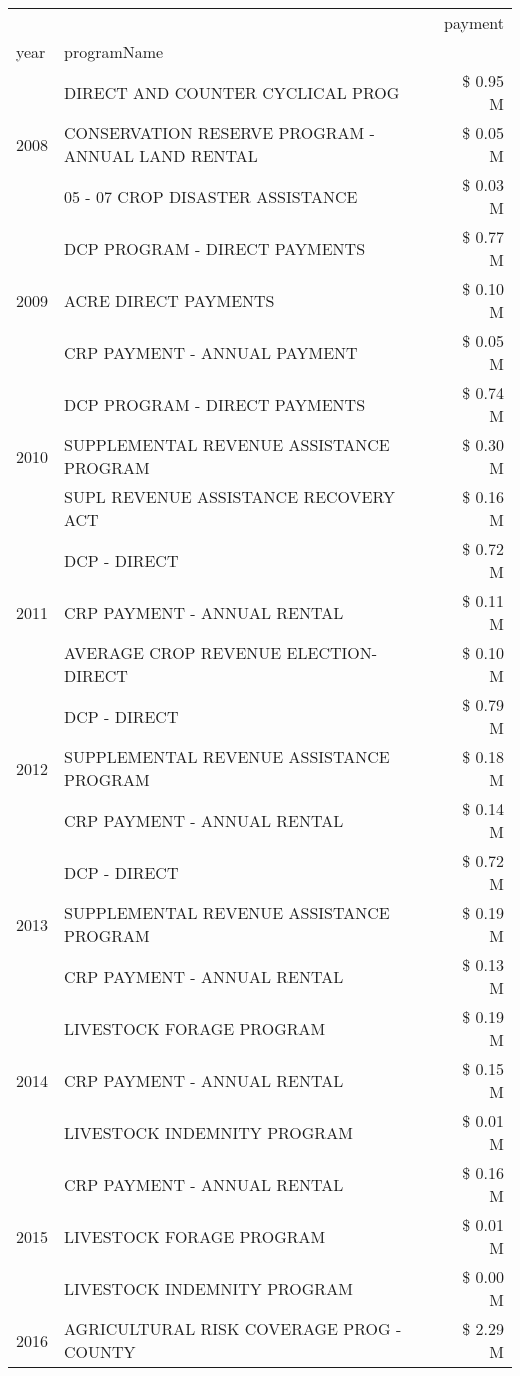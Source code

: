 \begin{tabular}{llr}
\toprule
 &  & payment \\
year & programName &  \\
\midrule
\multirow[t]{3}{*}{2008} & DIRECT AND COUNTER CYCLICAL PROG & \$ 0.95 M \\
 & CONSERVATION RESERVE PROGRAM - ANNUAL LAND RENTAL & \$ 0.05 M \\
 & 05 - 07 CROP DISASTER ASSISTANCE & \$ 0.03 M \\
\cline{1-3}
\multirow[t]{3}{*}{2009} & DCP PROGRAM - DIRECT PAYMENTS & \$ 0.77 M \\
 & ACRE DIRECT PAYMENTS & \$ 0.10 M \\
 & CRP PAYMENT - ANNUAL PAYMENT & \$ 0.05 M \\
\cline{1-3}
\multirow[t]{3}{*}{2010} & DCP PROGRAM - DIRECT PAYMENTS & \$ 0.74 M \\
 & SUPPLEMENTAL REVENUE ASSISTANCE PROGRAM & \$ 0.30 M \\
 & SUPL REVENUE ASSISTANCE RECOVERY ACT & \$ 0.16 M \\
\cline{1-3}
\multirow[t]{3}{*}{2011} & DCP - DIRECT & \$ 0.72 M \\
 & CRP PAYMENT - ANNUAL RENTAL & \$ 0.11 M \\
 & AVERAGE CROP REVENUE ELECTION-DIRECT & \$ 0.10 M \\
\cline{1-3}
\multirow[t]{3}{*}{2012} & DCP - DIRECT & \$ 0.79 M \\
 & SUPPLEMENTAL REVENUE ASSISTANCE PROGRAM & \$ 0.18 M \\
 & CRP PAYMENT - ANNUAL RENTAL & \$ 0.14 M \\
\cline{1-3}
\multirow[t]{3}{*}{2013} & DCP - DIRECT & \$ 0.72 M \\
 & SUPPLEMENTAL REVENUE ASSISTANCE PROGRAM & \$ 0.19 M \\
 & CRP PAYMENT - ANNUAL RENTAL & \$ 0.13 M \\
\cline{1-3}
\multirow[t]{3}{*}{2014} & LIVESTOCK FORAGE PROGRAM & \$ 0.19 M \\
 & CRP PAYMENT - ANNUAL RENTAL & \$ 0.15 M \\
 & LIVESTOCK INDEMNITY PROGRAM & \$ 0.01 M \\
\cline{1-3}
\multirow[t]{3}{*}{2015} & CRP PAYMENT - ANNUAL RENTAL & \$ 0.16 M \\
 & LIVESTOCK FORAGE PROGRAM & \$ 0.01 M \\
 & LIVESTOCK INDEMNITY PROGRAM & \$ 0.00 M \\
\cline{1-3}
\multirow[t]{3}{*}{2016} & AGRICULTURAL RISK COVERAGE PROG - COUNTY      & \$ 2.29 M \\

\end{tabular}

